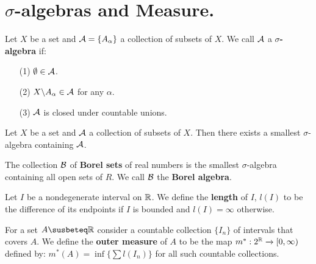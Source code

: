 
\section{$\sigma$-algebras and Measure.}

\begin{definition}
    Let $X$ be a set and  $\mathcal{A}=\{A_\alpha\}$ a collection of subsets of $X$. We
    call $\mathcal{A}$ a \textbf{$\sigma$-algebra} if:
     \begin{enumerate}
         \item[(1)] $\emptyset \in \mathcal{A}$.

         \item[(2)] $X \backslash A_\alpha \in \mathcal{A}$ for any $\alpha$.

         \item[(3)] $\mathcal{A}$ is closed under countable unions.
     \end{enumerate}
\end{definition}

\begin{theorem}\label{8.1.1}
    Let $X$ be a set and  $\mathcal{A}$ a collection of subsets of  $X$. Then there
    exists a smallest  $\sigma$-algebra containing  $\mathcal{A}$.
\end{theorem}

\begin{definition}
    The collection $\mathcal{B}$ of  \textbf{Borel sets} of real numbers is the smallest
    $\sigma$-algebra containing all open sets of  $R$. We call  $\mathcal{B}$ the
    \textbf{Borel algebra}.
\end{definition}

\begin{definition}
    Let $I$ be a nondegenerate interval on  $\mathbb{R}$. We define the  \textbf{length}
    of $I$,  $l(I)$ to be the difference of its endpoints if $I$ is bounded and
     $l(I)=\infty$ otherwise.
\end{definition}

\begin{definition}
    For a set $A \susbeteq \R$ consider a countable collection  $\{I_n\}$ of
    intervals that covers $A$. We define the \textbf{outer measure} of $A$ to be
    the map $m^*:2^{\mathbb{R}} \xrightarrow{} [0,\infty)$ defined by: $m^*(A)
    =\inf{\{\sum{l(I_n)}\}}$ for all such countable collections.
\end{definition}

